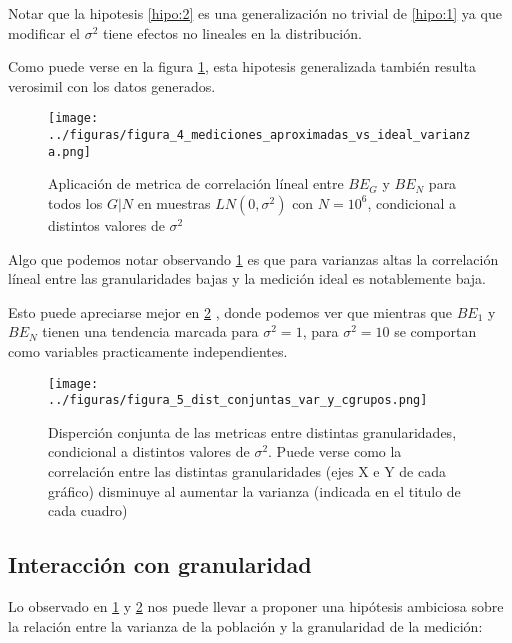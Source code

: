 Notar que la hipotesis \ref{hipo:2} es una generalización no trivial de \ref{hipo:1} ya que modificar el $\sigma^2$ tiene efectos no lineales en la distribución.

Como puede verse en la figura \ref{fig:4}, esta hipotesis generalizada también resulta verosimil con los datos generados.

\begin{figure}[H]
    \centering 
    \texttt{[image: ../figuras/figura\_4\_mediciones\_aproximadas\_vs\_ideal\_varianza.png]} 
    \caption{Aplicación de metrica de correlación líneal entre $BE_G$ y $BE_N$ para todos los $G | N$ en muestras $LN(0,\sigma^2)$ con $N=10^6$, condicional a distintos valores de $\sigma^2$}
    \label{fig:4}
\end{figure}

Algo que podemos notar observando \ref{fig:4} es que para varianzas altas la correlación líneal entre las granularidades bajas y la medición ideal es notablemente baja.

Esto puede apreciarse mejor en \ref{fig:5} , donde podemos ver que mientras que $BE_1$ y $BE_N$ tienen una tendencia marcada para $\sigma^2=1$, para $\sigma^2=10$ se comportan como variables practicamente independientes.

\begin{figure}[H]
    \centering 
    \texttt{[image: ../figuras/figura\_5\_dist\_conjuntas\_var\_y\_cgrupos.png]} 
    \caption{Disperción conjunta de las metricas entre distintas granularidades, condicional a distintos valores de $\sigma^2$. Puede verse como la correlación entre las distintas granularidades (ejes X e Y de cada gráfico) disminuye al aumentar la varianza (indicada en el titulo de cada cuadro)}
    \label{fig:5}
\end{figure}



\subsection{Interacción con granularidad}

Lo observado en \ref{fig:4} y \ref{fig:5} nos puede llevar a proponer una hipótesis ambiciosa sobre la relación entre la varianza de la población y la granularidad de la medición:

